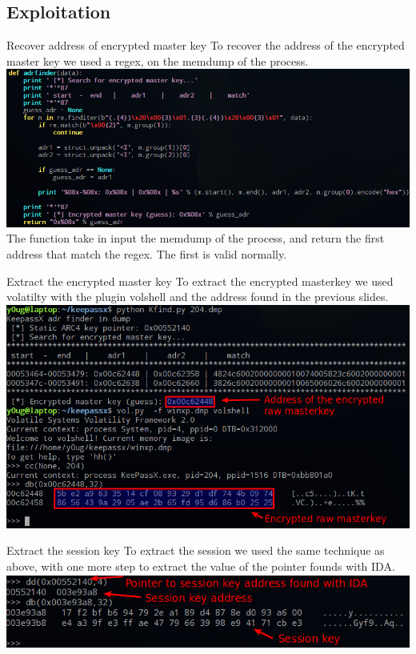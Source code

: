 \documentclass[compress]{beamer}
\begin{document}
\subsection{Exploitation}
\begin{frame}{Recover address of encrypted master key}
  To recover the address of the encrypted master key we used a regex, on the memdump of the process.\\
  \includegraphics[scale=0.35]{img/keypass_adr_finder}\\
  The function take in input the memdump of the process, and return the first address that match the regex. The first is valid normally.
\end{frame}

\begin{frame}{Extract the encrypted master key}
  To extract the encrypted masterkey we used volatilty with the plugin volshell and the address found in the previous slides.\\
  \vspace{0.2in}
  \includegraphics[scale=0.35]{img/keypass_volshell_masterkey}\\
\end{frame}

\begin{frame}{Extract the session key}
  To extract the session we used the same technique as above, with one more step to extract the value of the pointer founds with IDA.\\
  \vspace{0.2in}
  \includegraphics[scale=0.40]{img/keypass_volshell_sessionkey}\\
\end{frame}
\end{document}
